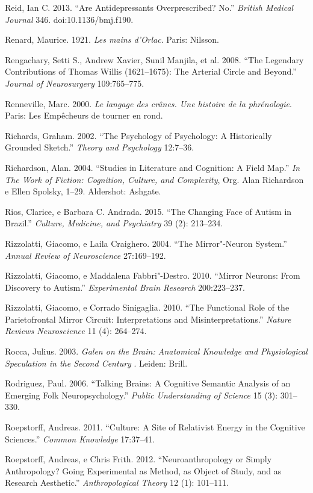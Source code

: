 Reid, Ian C. 2013. ``Are Antidepressants Overprescribed? No.''
\emph{British Medical Journal} 346. doi:10.1136/bmj.f190.

Renard, Maurice. 1921. \emph{Les mains d'Orlac}. Paris: Nilsson.

Rengachary, Setti S., Andrew Xavier, Sunil Manjila, et al. 2008. ``The
Legendary Contributions of Thomas Willis (1621--1675): The Arterial
Circle and Beyond.'' \emph{Journal of Neurosurgery} 109:765--775.

Renneville, Marc. 2000. \emph{Le langage des crânes. Une histoire de la
phrénologie}. Paris: Les Empêcheurs de tourner en rond.

Richards, Graham. 2002. ``The Psychology of Psychology: A Historically
Grounded Sketch.'' \emph{Theory and Psychology} 12:7--36.

Richardson, Alan. 2004. ``Studies in Literature and Cognition: A Field
Map.'' \emph{In The Work of Fiction: Cognition, Culture, and
Complexity}, Org. Alan Richardson e Ellen Spolsky, 1--29. Aldershot:
Ashgate.

Rios, Clarice, e Barbara C. Andrada. 2015. ``The Changing Face of Autism
in Brazil.'' \emph{Culture, Medicine, and Psychiatry} 39 (2): 213--234.

Rizzolatti, Giacomo, e Laila Craighero. 2004. ``The Mirror"-Neuron
System.'' \emph{Annual Review of Neuroscience} 27:169--192.

Rizzolatti, Giacomo, e Maddalena Fabbri"-Destro. 2010. ``Mirror Neurons:
From Discovery to Autism.'' \emph{Experimental Brain Research}
200:223--237.

Rizzolatti, Giacomo, e Corrado Sinigaglia. 2010. ``The Functional Role
of the Parietofrontal Mirror Circuit: Interpretations and
Misinterpretations.'' \emph{Nature Reviews Neuroscience} 11 (4):
264--274.

Rocca, Julius. 2003. \emph{Galen on the Brain: Anatomical Knowledge and
Physiological Speculation in the Second Century }. Leiden: Brill.

Rodriguez, Paul. 2006. ``Talking Brains: A Cognitive Semantic Analysis
of an Emerging Folk Neuropsychology.'' \emph{Public Understanding of
Science} 15 (3): 301--330.

Roepstorff, Andreas. 2011. ``Culture: A Site of Relativist Energy in the
Cognitive Sciences.'' \emph{Common Knowledge} 17:37--41.

Roepstorff, Andreas, e Chris Frith. 2012. ``Neuroanthropology or Simply
Anthropology? Going Experimental as Method, as Object of Study, and as
Research Aesthetic.'' \emph{Anthropological Theory} 12 (1): 101--111.

